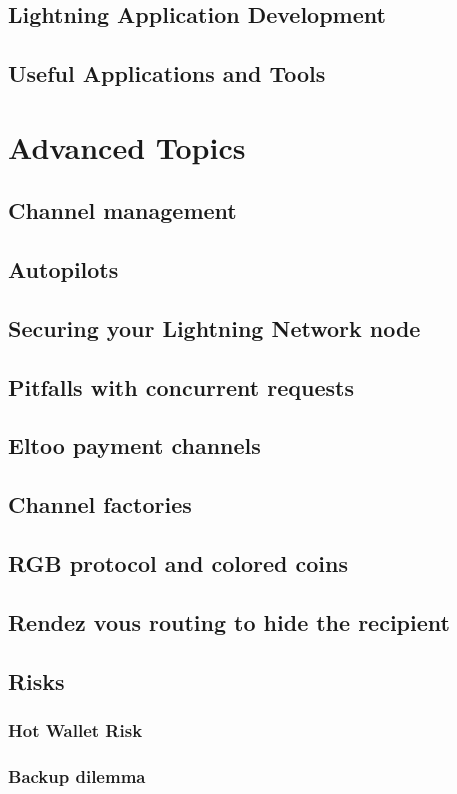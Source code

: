 \documentclass[ebook,12pt,oneside,openany]{memoir}
\begin{document}
\section{Lightning Application Development}
\section{Useful Applications and Tools}
\chapter{Advanced Topics}
\section{Channel management}
\section{Autopilots}
\section{Securing your Lightning Network node}
\section{Pitfalls with concurrent requests}
\section{Eltoo payment channels}
\section{Channel factories}
\section{RGB protocol and colored coins}
\section{Rendez vous routing to hide the recipient}
\section{Risks}
\subsection{Hot Wallet Risk}
\subsection{Backup dilemma}
\end{document}
